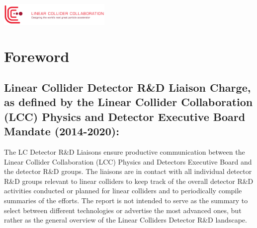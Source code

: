 \documentclass[10pt,final]{report}
\begin{document}
\begin{titlepage}
	\vfill\vfill
    \includegraphics[width=0.4\textwidth]{signature_red2-cmyk}\\[1cm] %
	
	\vfill %
	
\end{titlepage}

\tableofcontents
\chapter*{Foreword}
\section*{Linear Collider Detector R\&D Liaison Charge, as defined by the Linear Collider
Collaboration (LCC) Physics and Detector Executive Board Mandate (2014-2020):}
The LC Detector R\&D Liaisons ensure productive communication between the Linear
Collider Collaboration (LCC) Physics and Detectors Executive Board and the detector R\&D
groups. The liaisons are in contact with all individual detector R\&D groups relevant to linear
colliders to keep track of the overall detector R\&D activities conducted or planned for linear
colliders and to periodically compile summaries of the efforts. The report is not intended to
serve as the summary to select between different technologies or advertise the most
advanced ones, but rather as the general overview of the Linear Colliders Detector R\&D
landscape.
\end{document}
